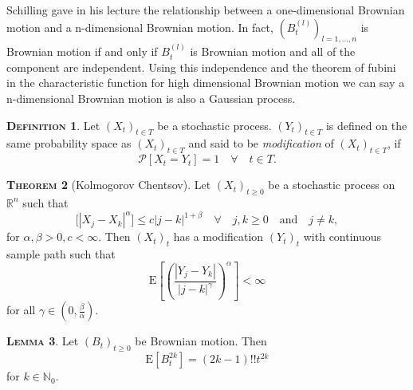 \documentclass[a4paper, twoside, 11pt]{article}
\theoremstyle{definition}
\newtheorem{definition}{\scshape Definition}[section]
\newtheorem{theorem}[definition]{\scshape Theorem}
\newtheorem{lemma}[definition]{\scshape Lemma}
\begin{document}
Schilling gave in his lecture \cite{shilling} the relationship between a one-dimensional Brownian motion and a n-dimensional Brownian motion.
In fact, $(B_t^{(l)})_{l=1,\dots,n}$ is Brownian motion if and only if $B_t^{(l)}$ is Brownian motion and all of the component are independent. Using this independence and the theorem of fubini in the characteristic function for high dimensional Brownian motion we can say a n-dimensional Brownian motion is also a Gaussian process.

\begin{definition}
  Let $(X_t)_{t\in T}$  be a stochastic process. $(Y_t)_{t\in T}$ is defined on the same probability space as $(X_t)_{t\in T}$ and said to be \emph{modification} of $(X_t)_{t\in T}$, if
  \begin{equation*}
	\mathcal{P}[X_t = Y_t] = 1 \hspace{1em} \forall \hspace{1em} t\in T.
  \end{equation*}
\end{definition}

\begin{theorem}[Kolmogorov Chentsov]
  Let $(X_t)_{t \ge 0}$ be a stochastic process on $\mathbb{R}^{n}$ such that
  \begin{equation*}
	\mathrm[|X_j - X_k|^\alpha] \le c |j - k|^{1+\beta} \hspace{1em}\forall \hspace{1em} j ,k \ge 0 \hspace{1em} \text{and} \hspace{1em} j\neq k,
  \end{equation*}
  for $\alpha, \beta > 0, c < \infty$. Then $(X_t)_t$ has a modification $(Y_t)_t$ with continuous sample path such that 
  \begin{equation*}
	\mathrm{E}[(\frac{|Y_j - Y_k|}{|j - k|^\gamma})^\alpha] < \infty
  \end{equation*}
  for all $\gamma \in (0, \frac{\beta}{\alpha})$.
  \label{sec:kolch}
\end{theorem}

\begin{lemma}
   Let $(B_t)_{t\ge 0}$ be Brownian motion. Then
   \begin{equation*}
	 \mathrm{E}[B_t^{2k}] = (2k - 1)!! t^{2k}
   \end{equation*}
   for $k \in \mathbb{N}_0$.
   \label{sec:le1}
\end{lemma}
\end{document}
